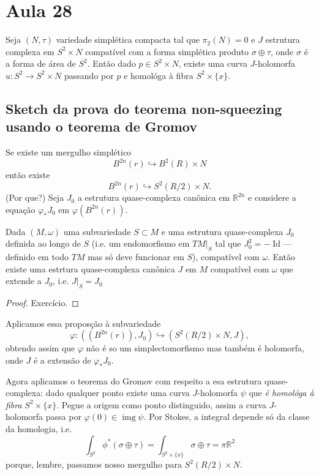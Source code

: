 \section{Aula 28}

\begin{thm}[Gromov]\leavevmode
	Seja $(N,\tau)$ variedade simplética compacta tal que $\pi_{2}(N)=0$ e $J$ estrutura complexa em $S^2 \times N$ compatível com a forma simplética produto $\sigma \oplus  \tau$, onde $\sigma$ é a forma de área de $S^2$. Então dado $p \in S^2 \times N$, existe uma curva $J$-holomorfa $u:S^2\to S^2 \times N$ passando por $p$ e homológa à fibra $S^2 \times \{x\}$.
\end{thm}

\subsection{Sketch da prova do teorema non-squeezing usando o teorema de Gromov}
Se existe um mergulho simplético
\[B^{2n}(r) \hookrightarrow B^2(R)\times N\]
então existe
\[B^{2n}(r) \hookrightarrow  S^2(R/2) \times N.\]
(Por que?) Seja $J_0$ a estrutura quase-complexa canônica em $\mathbb{R}^{2n}$ e considere a equação $\varphi_*J_0$ em $\varphi(B^{2n}(r))$.

\begin{prop}\leavevmode
	Dada $(M,\omega)$ uma subvariedade $S \subset M$ e uma estrutura quase-complexa $J_0$ definida ao longo de $S$ (i.e. um endomorfismo em  $TM|_{S}$ tal que $J_0^2=-\operatorname{Id}$---definido em todo $TM$ mas  só deve funcionar em $S$), compatível com $\omega$. Então existe uma estrtura quase-complexa canônica $J$ em $M$ compatível com $\omega$ que extende a $J_0$, i.e. $J|_{S}=J_0$
\end{prop}

\begin{proof}\leavevmode
Exercício.
\end{proof}

Aplicamos essa proposção à subvariedade \[\varphi:((B^{2n}(r)),J_0)\hookrightarrow  (S^2(R/2)\times N,J),\]
obtendo assim que $\varphi$ não é so um simplectomorfismo mas também é holomorfa, onde $J$ é a extensão de $\varphi_*J_0$.

Agora aplicamos o teorema do Gromov com respeito a esa estrutura quase-complexa: dado qualquer ponto existe uma curva $J$-holomorfa $\psi$ que \textit{é homológa à fibra}  $S^2\times\{x\}$. Pegue a origem como ponto distinguido, assim a curva $J$-holomorfa passa por $\varphi(0) \in \operatorname{img}\psi$. Por Stokes, a integral depende só da classe da homologia, i.e.
\[\int_{S^2}\phi^* (\sigma \oplus \tau)=\int_{S^2\times \{x\}}\sigma \oplus  \tau=\pi \mathbb{R}^2\]
porque, lembre, passamos nosso mergulho para $S^2(R/2)\times N$.

